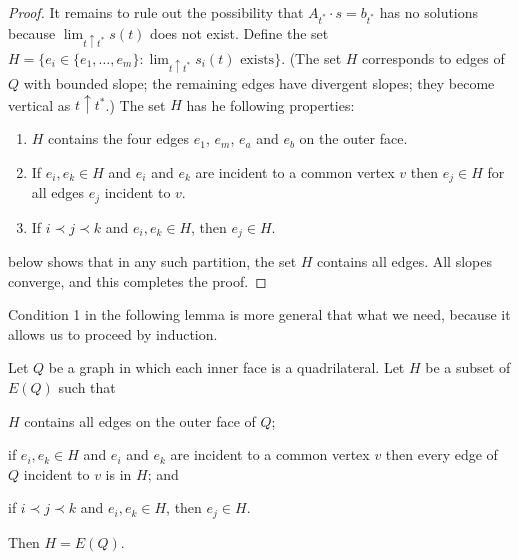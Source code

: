 \documentclass{patmorin}
\begin{document}
\begin{proof}
 It remains to rule out the possibility that
 $A_{t^*}\cdot s=b_{t^*}$ has no solutions because
   $\lim_{t\uparrow t^*} s(t)$ does not exist.  Define the set $H=\{e_i\in
   \{e_1,\ldots,e_m\}:\text{$\lim_{t\uparrow t^*} s_i(t)$ exists}\}$.
(The set $H$ corresponds to edges of $Q$
   with
   bounded slope; the remaining edges have divergent slopes; they become vertical as $t\uparrow t^*$.)
The set   $H$ has he following
   properties:
   \begin{enumerate}
    \item $H$ contains the four edges $e_1$, $e_m$, $e_a$ and $e_b$
      on the outer face.
    \item If $e_i,e_k\in H$ and $e_i$ and $e_k$ are incident to a common
      vertex $v$ then $e_j\in H$ for all edges $e_j$ incident to $v$.
    \item If $i \prec j \prec k$ and $e_i,e_k\in H$, 
      then $e_j\in H$.
   \end{enumerate}
    below shows that in any such partition, the set
   $H$ contains all edges. All slopes converge, and this 
   completes the proof.
\end{proof}

Condition 1 in the following lemma is more general that what we need, because it allows us to
proceed by induction.

\begin{lem}
   Let $Q$ be a graph in which each inner face is a
   quadrilateral. Let $H$ be a subset of $E(Q)$ such that
   \begin{compactenum}
    \item $H$ contains all edges on the outer face 
      of $Q$;
    \item if $e_i,e_k\in H$ and $e_i$ and $e_k$ are incident to a common
      vertex $v$ then every edge of $Q$ incident to $v$ is in $H$; and
    \item if $i \prec j \prec k$ and $e_i,e_k\in H$, 
      then $e_j\in H$.
   \end{compactenum}
   Then $H=E(Q)$.
\end{lem}
\end{document}
